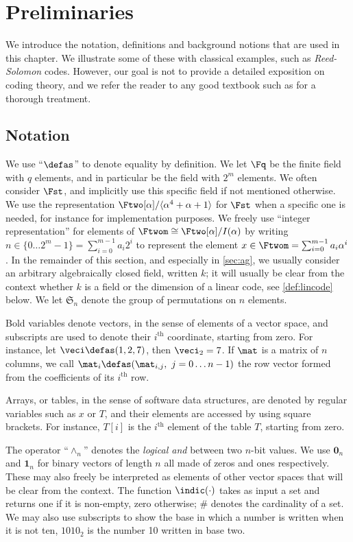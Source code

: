 \section{Preliminaries}
\label{not}

We introduce the notation, definitions and background notions that are used in this chapter. We illustrate some of these with classical examples, such as \emph{Reed-Solomon} codes. However,
our goal is not to provide a detailed exposition on coding theory, and we refer the reader to any good textbook such as \cite{vanlint} for a thorough treatment.

\subsection{Notation}
We use ``$\defas$'' to denote equality by definition.
We let $\Fq$
be the finite field with $q$ elements, and in particular
\Ftwom{} be the field with $2^m$ elements. We often consider $\Fst$, and implicitly use this specific field if not mentioned otherwise.
We use the representation
$\Ftwo[\alpha]/\langle\alpha^4 + \alpha + 1\rangle$ for $\Fst$ when a specific one is needed,
for instance for implementation purposes. We freely use ``integer representation'' for elements of $\Ftwom \cong \Ftwo[\alpha]/I(\alpha)$
by writing $n \in \{0\ldots2^m-1\} = \sum_{i = 0}^{m-1} a_i 2^i$ to represent the element
$x \in \Ftwom = \sum_{i = 0}^{m-1} a_i \alpha^i$. In the remainder of this section, and especially in \autoref{sec:ag}, we usually consider an arbitrary algebraically closed field, written $k$;
it will usually be clear from the context whether $k$ is a field or the dimension of a linear code, see \autoref{def:lincode} below.
We let $\mathfrak{S}_n$ denote the group of permutations on $n$ elements.

Bold variables denote vectors, in the sense of elements of a vector space, and subscripts are used to denote their $i^\text{th}$ coordinate, starting from zero. For instance,
let $\veci \defas (1, 2, 7)$, then  $\veci_2 = 7$.
If $\mat$ is a matrix of $n$ columns, we call $\mat_i \defas (\mat_{i,j},~j = 0\ldots n - 1)$ the row vector formed from the coefficients of
its $i^\text{th}$ row.

Arrays, or tables, in the sense of software data structures, are denoted by regular variables such as $x$ or $T$, and their elements are accessed by using square brackets.
For instance, $T[i]$ is the $i^\text{th}$ element of the table $T$, starting from zero.

The operator ``$\wedge_{n}$'' denotes the  \emph{logical and} between two $n$-bit values.
We use $\mathbf{0}_{n}$ and $\mathbf{1}_n$ for binary vectors of length $n$ all made of
zeros and ones respectively. These may also freely be interpreted as elements of other vector spaces that will be clear from the context.
The function $\indic(\cdot)$ takes as input a set and returns one if it is non-empty, zero otherwise; $\#$ denotes the cardinality of a set.
We may also use subscripts to show the base in which a number is written when it is not ten, \eg $1010_2$ is the number 10 written in base two.

